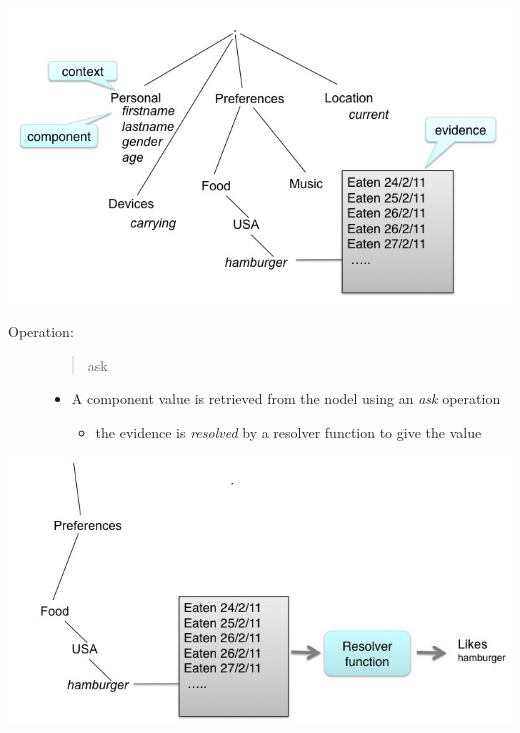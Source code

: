 \documentclass[a4paper,10pt,english]{sphinxmanual}
\begin{document}
\includegraphics{accretion.jpg}
\begin{description}
\item[{Operation:}] \leavevmode\begin{quote}

ask
\end{quote}
\begin{itemize}
\item {} 
A component value is retrieved from the nodel using an \emph{ask} operation
\begin{itemize}
\item {} 
the evidence is \emph{resolved} by a resolver function to give the value

\end{itemize}

\end{itemize}

\end{description}

\includegraphics{resolution.jpg}
\end{document}
